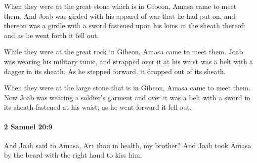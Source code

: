 			\begin{versebox}
					\item[BHS] 
					\item[ASV] When they were at the great stone which is in Gibeon, Amasa came to meet them. And Joab was girded with his apparel of war that he had put on, and thereon was a girdle with a sword fastened upon his loins in the sheath thereof; and as he went forth it fell out.
					\item[NIV] While they were at the great rock in Gibeon, Amasa came to meet them. Joab was wearing his military tunic, and strapped over it at his waist was a belt with a dagger in its sheath. As he stepped forward, it dropped out of its sheath.
					\item[NRSV] When they were at the large stone that is in Gibeon, Amasa came to meet them. Now Joab was wearing a soldier’s garment and over it was a belt with a sword in its sheath fastened at his waist; as he went forward it fell out.
			\end{versebox}

		\paragraph{2 Samuel 20:9} %
			\label{2SAMUEL-20-9}

			And Joab said to Amasa, Art thou in health, my brother? And Joab took Amasa by the beard with the right hand to kiss him.

